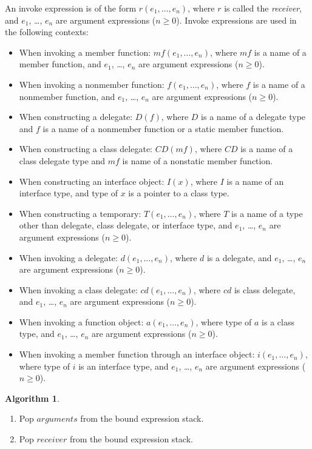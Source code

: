 \documentclass[a4paper,oneside,11pt]{book}
\theoremstyle{definition}
\newtheorem{algo}{Algorithm}[section]
\begin{document}
An invoke expression is of the form $r(e_1, \ldots, e_n)$, where $r$ is called the \emph{receiver}, and $e_1$, \ldots, $e_n$ are argument expressions ($n \geq 0$).
Invoke expressions are used in the following contexts:

\begin{itemize}
\item
When invoking a member function: $mf(e_1, \ldots, e_n)$, where $mf$ is a name of a member function,
and $e_1$, \ldots, $e_n$ are argument expressions ($n \geq 0$).
\item
When invoking a nonmember function: $f(e_1, \ldots, e_n)$, where $f$ is a name of a nonmember function,
and $e_1$, \ldots, $e_n$ are argument expressions ($n \geq 0$).
\item
When constructing a delegate: $D(f)$, where $D$ is a name of a delegate type and $f$ is a name of a nonmember function or a static member function.
\item
When constructing a class delegate: $CD(mf)$, where $CD$ is a name of a class delegate type and $mf$ is name of a nonstatic member function.
\item
When constructing an interface object: $I(x)$, where $I$ is a name of an interface type, and type of $x$ is a pointer to a class type.
\item
When constructing a temporary: $T(e_1, \ldots, e_n)$, where $T$ is a name of a type other than delegate, class delegate, or interface type,
and $e_1$, \ldots, $e_n$ are argument expressions ($n \geq 0$).
\item
When invoking a delegate: $d(e_1, \ldots, e_n)$, where $d$ is a delegate, and $e_1$, \ldots, $e_n$ are argument expressions ($n \geq 0$).
\item
When invoking a class delegate: $cd(e_1, \ldots, e_n)$, where $cd$ is class delegate, and $e_1$, \ldots, $e_n$ are argument expressions ($n \geq 0$).
\item
When invoking a function object: $a(e_1, \ldots, e_n)$, where type of $a$ is a class type, and $e_1$, \ldots, $e_n$ are argument expressions ($n \geq 0$).
\item
When invoking a member function through an interface object: $i(e_1, \ldots, e_n)$, where type of $i$ is an interface type,
and $e_1$, \ldots, $e_n$ are argument expressions ($n \geq 0$).
\end{itemize}

\begin{algo}\label{bindinvoke}
\begin{enumerate}
\item
Pop $arguments$ from the bound expression stack.
\item
Pop $receiver$ from the bound expression stack.
\end{enumerate}
\end{algo}
\end{document}
